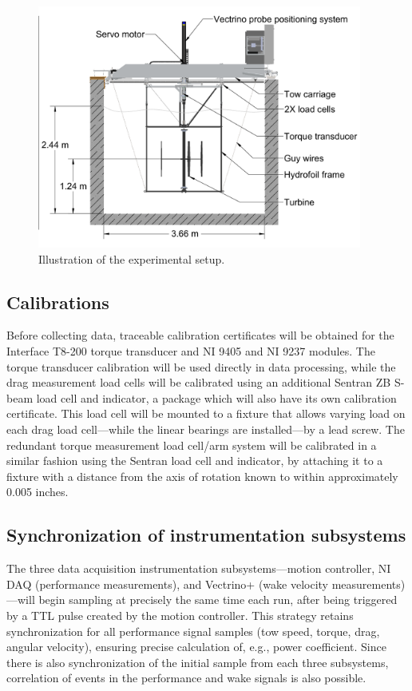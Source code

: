 \documentclass[12pt,letterpaper]{scrreprt}
\begin{document}
\begin{figure}[ht]
\centering
\includegraphics[clip,trim=0.01in 0 0 0, width=0.95\textwidth]{Figures/tank_cross_section}
\caption{Illustration of the experimental setup.}
\label{fig-exp_setup}
\end{figure}


\subsection{Calibrations}

Before collecting data, traceable calibration certificates will be obtained for
the Interface T8-200 torque transducer and NI 9405 and NI 9237 modules. The
torque transducer calibration will be used directly in data processing, while
the drag measurement load cells will be calibrated using an additional Sentran
ZB S-beam load cell and indicator, a package which will also have its own
calibration certificate. This load cell will be mounted to a fixture that allows
varying load on each drag load cell---while the linear bearings are
installed---by a lead screw.  The redundant torque measurement load cell/arm
system will be calibrated in a similar fashion using the Sentran load cell and
indicator, by attaching it to a fixture with a distance from the axis of
rotation known to within approximately 0.005 inches.

\subsection{Synchronization of instrumentation subsystems}

The three data acquisition instrumentation subsystems---motion controller, NI
DAQ (performance measurements), and Vectrino+ (wake velocity
measurements)---will begin sampling at precisely the same time each run, after
being triggered by a TTL pulse created by the motion controller. This strategy
retains synchronization for all performance signal samples (tow speed, torque,
drag, angular velocity), ensuring precise calculation of, e.g., power
coefficient. Since there is also synchronization of the initial sample from each
three subsystems, correlation of events in the performance and wake signals is
also possible.
\end{document}
